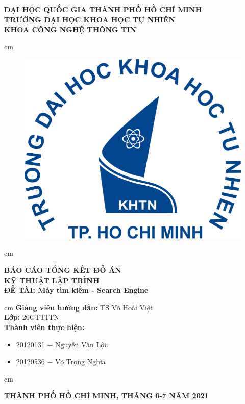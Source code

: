 \documentclass[12pt,a4paper]{article}
\author{Nguyễn Văn Lộc}
\begin{document}
\fancyhf{}
\chead{}
\cfoot{\thepage}
\rfoot{}
\lfoot{}
\pagestyle{fancy}
\renewcommand{\headrulewidth}{0pt}
\renewcommand{\footrulewidth}{0pt}
\begin{titlepage}
\begin{mybox}
\begin{center}
\fontsize{12}{12}\selectfont
\textbf{ĐẠI HỌC QUỐC GIA THÀNH PHỐ HỒ CHÍ MINH}\\
\textbf{TRƯỜNG ĐẠI HỌC KHOA HỌC TỰ NHIÊN}\\
\textbf{KHOA CÔNG NGHỆ THÔNG TIN}
\end{center}
 cm
\begin{figure}[H]
\begin{center}
\includegraphics[scale=0.25]{logo}
\end{center}
\end{figure}
 cm
\begin{center}
\fontsize{18}{14}\selectfont
\textbf{BÁO CÁO TỔNG KẾT ĐỒ ÁN}\\
\fontsize{26}{16}\selectfont
\textbf{KỸ THUẬT LẬP TRÌNH}\\
\fontsize{18}{12}\selectfont
\textbf{ĐỀ TÀI: Máy tìm kiếm - Search Engine}
\end{center}
 cm
\fontsize{14}{12}\selectfont
\textbf{Giảng viên hướng dẫn:} TS Võ Hoài Việt\\
\textbf{Lớp:} 20CTT1TN\\
\textbf{Thành viên thực hiện:}
\begin{itemize}
\item 20120131 \(-\) Nguyễn Văn Lộc
\item 20120536 \(-\) Võ Trọng Nghĩa
\end{itemize}
 cm
\begin{center}
\textbf{THÀNH PHỐ HỒ CHÍ MINH, THÁNG 6-7 NĂM 2021}
\end{center}
\end{mybox}
\end{titlepage}
\tableofcontents
\newpage
\listoffigures
\listoftables
\newpage
\end{document}
